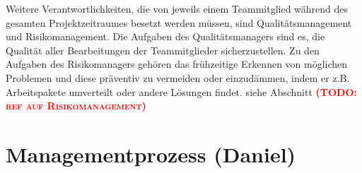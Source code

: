 \documentclass[fontsize=12pt,paper=a4,twoside]{scrartcl}
\newcommand{\todo}[1]{\textbf{\textsc{\textcolor{red}{(TODO: #1)}}}}
\begin{document}
Weitere Verantwortlichkeiten, die von jeweils einem Teammitglied während des gesamten Projektzeitraumes besetzt werden müssen, sind Qualitätsmanagement und Risikomanagement.
Die Aufgaben des Qualitätsmanagers sind es, die Qualität aller Bearbeitungen der Teammitglieder sicherzustellen.
Zu den Aufgaben des Risikomanagers gehören das frühzeitige Erkennen von möglichen Problemen und diese präventiv zu vermeiden oder einzudämmen, indem er z.B. Arbeitspakete umverteilt oder andere Lösungen findet. siehe Abschnitt \todo{ref auf Risikomanagement}


\section{Managementprozess (Daniel)}
\end{document}
